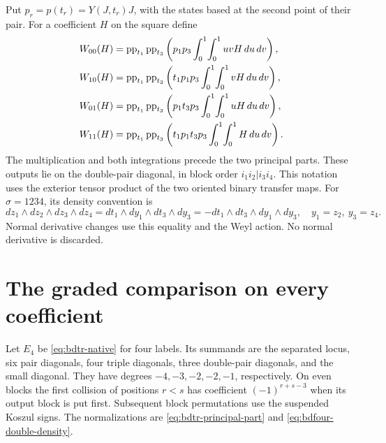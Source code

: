 Put $p_r=p(t_r)=Y(J,t_r)J$, with the states based at the second point of their pair.
For a coefficient $H$ on the square define
\[
 \begin{aligned}
 W_{00}(H)&=\operatorname{pp}_{t_1}\operatorname{pp}_{t_3}\left(p_1p_3\int_0^1\!\int_0^1uvH\,du\,dv\right),\\
 W_{10}(H)&=\operatorname{pp}_{t_1}\operatorname{pp}_{t_3}\left(t_1p_1p_3\int_0^1\!\int_0^1vH\,du\,dv\right),\\
 W_{01}(H)&=\operatorname{pp}_{t_1}\operatorname{pp}_{t_3}\left(p_1t_3p_3\int_0^1\!\int_0^1uH\,du\,dv\right),\\
 W_{11}(H)&=\operatorname{pp}_{t_1}\operatorname{pp}_{t_3}\left(t_1p_1t_3p_3\int_0^1\!\int_0^1H\,du\,dv\right).
 \end{aligned}
\]
The multiplication and both integrations precede the two principal parts.
These outputs lie on the double-pair diagonal, in block order $i_1i_2|i_3i_4$.
This notation uses the exterior tensor product of the two oriented binary transfer maps.
For $\sigma=1234$, its density convention is
\begin{equation}\label{eq:bdfour-double-density}
 dz_1\wedge dz_2\wedge dz_3\wedge dz_4
 =dt_1\wedge dy_1\wedge dt_3\wedge dy_3
 =-dt_1\wedge dt_3\wedge dy_1\wedge dy_3,
 \quad y_1=z_2,\ y_3=z_4.
\end{equation}
Normal derivative changes use this equality and the Weyl action.
No normal derivative is discarded.

\section{The graded comparison on every coefficient}

Let $E_4$ be \eqref{eq:bdtr-native} for four labels.
Its summands are the separated locus, six pair diagonals, four triple diagonals, three double-pair diagonals, and the small diagonal.
They have degrees $-4,-3,-2,-2,-1$, respectively.
On even blocks the first collision of positions $r<s$ has coefficient $(-1)^{r+s-3}$ when its output block is put first.
Subsequent block permutations use the suspended Koszul signs.
The normalizations are \eqref{eq:bdtr-principal-part} and \eqref{eq:bdfour-double-density}.

